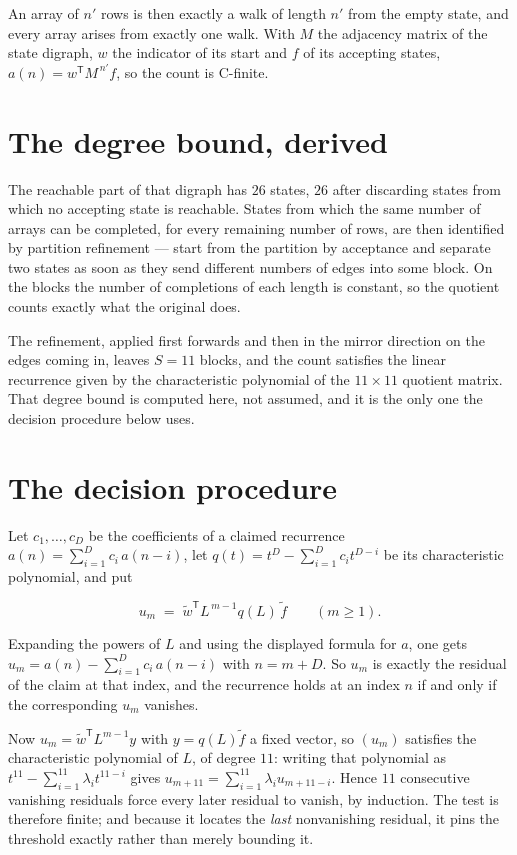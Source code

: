 \documentclass[11pt]{article}
\theoremstyle{definition}
\begin{document}
An array of $n'$ rows is then exactly a walk of length $n'$ from the empty state, and every array arises from exactly one walk. With $M$ the adjacency matrix of the state digraph, $w$ the indicator of its start and $f$ of its accepting states, $a(n) = w^{\mathsf T}M^{\,n'}f$, so the count is C-finite.

\section{The degree bound, derived}

The reachable part of that digraph has $26$ states, $26$ after discarding states from which no accepting state is reachable. States from which the same number of arrays can be completed, for every remaining number of rows, are then identified by partition refinement --- start from the partition by acceptance and separate two states as soon as they send different numbers of edges into some block. On the blocks the number of completions of each length is constant, so the quotient counts exactly what the original does.

The refinement, applied first forwards and then in the mirror direction on the edges coming in, leaves $S = 11$ blocks, and the count satisfies the linear recurrence given by the characteristic polynomial of the $11 \times 11$ quotient matrix. That degree bound is computed here, not assumed, and it is the only one the decision procedure below uses.

\section{The decision procedure}

Let $c_1,\dots,c_D$ be the coefficients of a claimed recurrence $a(n) = \sum_{i=1}^{D} c_i\,a(n-i)$, let $q(t) = t^{D} - \sum_{i=1}^{D} c_i t^{D-i}$ be its characteristic polynomial, and put

\[u_m \;=\; \tilde w^{\mathsf T} L^{\,m-1} q(L)\,\tilde f \qquad (m \ge 1).\]

Expanding the powers of $L$ and using the displayed formula for $a$, one gets $u_m = a(n) - \sum_{i=1}^{D} c_i\,a(n-i)$ with $n = m + D$. So $u_m$ is exactly the residual of the claim at that index, and the recurrence holds at an index $n$ if and only if the corresponding $u_m$ vanishes.

Now $u_m = \tilde w^{\mathsf T} L^{m-1} y$ with $y = q(L)\tilde f$ a fixed vector, so $(u_m)$ satisfies the characteristic polynomial of $L$, of degree $11$: writing that polynomial as $t^{11} - \sum_{i=1}^{11} \lambda_i t^{11-i}$ gives $u_{m+11} = \sum_{i=1}^{11} \lambda_i u_{m+11-i}$. Hence $11$ consecutive vanishing residuals force every later residual to vanish, by induction. The test is therefore finite; and because it locates the {\itshape last} nonvanishing residual, it pins the threshold exactly rather than merely bounding it.
\end{document}
